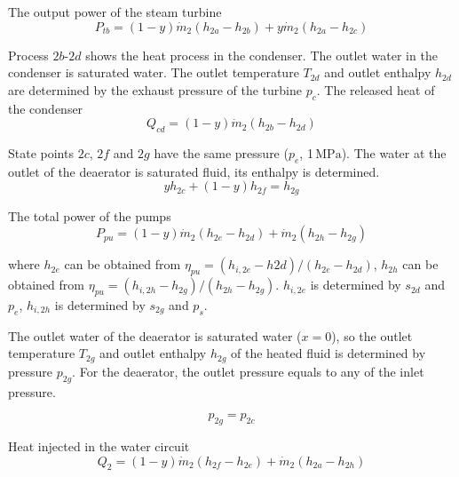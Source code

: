     The output power of the steam turbine
    \begin{equation}
  P_{tb}=\left(1-y\right)\dot{m}_{2}\left(h_{2a}-h_{2b}\right)+y\dot{m}_{2}\left(h_{2a}-h_{2c}\right)
  \end{equation}
  
  Process $2b$-$2d$ shows the heat process in the condenser. The outlet water in the condenser is saturated water. The outlet temperature $T_{2d}$ and outlet enthalpy $h_{2d}$ are determined by the exhaust pressure of the turbine $p_c$.
  The released heat of the condenser
  \begin{equation}
      Q_{cd} = (1-y)\dot{m}_2 (h_{2b} - h_{2d})
\end{equation}

  State points $2c$, $2f$ and $2g$ have the same pressure ($p_e$, 1$\,\mathrm{MPa}$). The water at the outlet of the deaerator is saturated fluid, its enthalpy is determined.
  \begin{equation}
  y h_{2c} + (1-y) h_{2f} = h_{2g}
\end{equation}
  
  The total power of the pumps 
\begin{equation}
	P_{pu}=\left(1-y\right)\dot{m}_{2}\left(h_{2e}-h_{2d}\right)+\dot{m}_{2}\left(h_{2h}-h_{2g}\right)
\end{equation}
    
where $h_{2e}$ can be obtained from $\eta_{pu} = (h_{i,2e}-h{2d})/(h_{2e}-h_{2d})$, $h_{2h}$ can be obtained from $\eta_{pu} = (h_{i,2h}-h_{2g})/(h_{2h}-h_{2g})$. $h_{i,2e}$ is determined by $s_{2d}$ and $p_e$, $h_{i,2h}$ is determined by $s_{2g}$ and $p_s$.
    
The outlet water of the deaerator is saturated water ($x = 0$), so the outlet temperature $T_{2g}$ and outlet enthalpy $h_{2g}$ of the heated fluid is determined by pressure $p_{2g}$. For the deaerator, the outlet pressure equals to any of the inlet pressure.

\begin{equation}
  p_{2g} = p_{2c}
\end{equation}

    
  Heat injected in the water circuit
\begin{equation}
	    Q_2=\left(1-y\right)\dot{m}_{2}\left(h_{2f}-h_{2e}\right)+\dot{m}_{2}\left(h_{2a}-h_{2h}\right)
    \end{equation}


